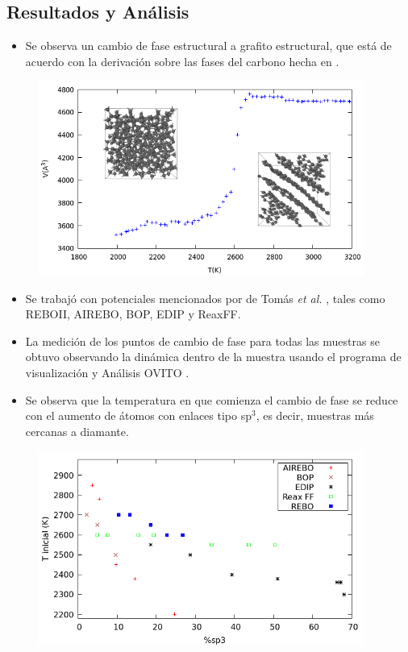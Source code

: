\documentclass[a0]{sciposter}
\begin{document}
\begin{multicols}{2}
\section{Resultados y Análisis}
\begin{itemize}
\item  Se observa un cambio de fase estructural a grafito estructural, que está de acuerdo con la derivación sobre las fases del carbono hecha en \cite{Zazula}. \\
\end{itemize}
  \begin{figure}
        \includegraphics[width=0.95\textwidth]{melting.png}
        \label{fig:meltproc}
\end{figure}
\begin{itemize}
\item Se trabajó con potenciales mencionados por de Tom\'as {\it et al.} \cite{ACPot1}, tales como REBOII, AIREBO, BOP, EDIP y ReaxFF.\\
\item La medición de los puntos de cambio de fase para todas las muestras se obtuvo observando la dinámica dentro de la muestra usando el programa de visualizaci\'on y An\'alisis OVITO \cite{Ovito}. \\
\item Se observa que la temperatura en que comienza el cambio de fase se reduce con el aumento de \'atomos con enlaces tipo sp$^3$, es decir, muestras m\'as cercanas a diamante.\\ 
\end{itemize}
\begin{figure}
        \includegraphics[width=0.95\textwidth]{datamelting.png}
        \label{fig:meltdata}
\end{figure}


\end{multicols}
\end{document}
